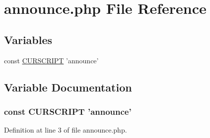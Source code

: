 \hypertarget{announce_8php}{\section{announce.\+php File Reference}
\label{announce_8php}
}
\subsection*{Variables}
\begin{DoxyCompactItemize}
\item 
const \hyperlink{announce_8php_a39c39f525eceb86cabc338804f230e80}{C\+U\+R\+S\+C\+R\+I\+P\+T} 'announce'
\end{DoxyCompactItemize}


\subsection{Variable Documentation}
\hypertarget{announce_8php_a39c39f525eceb86cabc338804f230e80}{
\subsubsection[{C\+U\+R\+S\+C\+R\+I\+P\+T}]{\setlength{\rightskip}{0pt plus 5cm}const C\+U\+R\+S\+C\+R\+I\+P\+T 'announce'}}\label{announce_8php_a39c39f525eceb86cabc338804f230e80}


Definition at line 3 of file announce.\+php.

